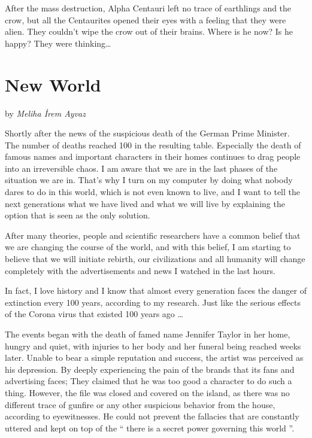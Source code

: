 \documentclass[]{book}
\begin{document}
After the mass destruction, Alpha Centauri left no trace of earthlings and the crow, but all the Centaurites opened their eyes with a feeling that they were alien. They couldn't wipe the crow out of their brains. Where is he now? Is he happy? They were thinking\ldots{}

\hypertarget{new-world}{%
\chapter{New World}\label{new-world}}

by \emph{Meliha İrem Ayvaz}

Shortly after the news of the suspicious death of the German Prime Minister. The number of deaths reached 100 in the resulting table. Especially the death of famous names and important characters in their homes continues to drag people into an irreversible chaos. I am aware that we are in the last phases of the situation we are in. That's why I turn on my computer by doing what nobody dares to do in this world, which is not even known to live, and I want to tell the next generations what we have lived and what we will live by explaining the option that is seen as the only solution.

After many theories, people and scientific researchers have a common belief that we are changing the course of the world, and with this belief, I am starting to believe that we will initiate rebirth, our civilizations and all humanity will change completely with the advertisements and news I watched in the last hours.

In fact, I love history and I know that almost every generation faces the danger of extinction every 100 years, according to my research. Just like the serious effects of the Corona virus that existed 100 years ago \ldots{}

The events began with the death of famed name Jennifer Taylor in her home, hungry and quiet, with injuries to her body and her funeral being reached weeks later. Unable to bear a simple reputation and success, the artist was perceived as his depression. By deeply experiencing the pain of the brands that its fans and advertising faces; They claimed that he was too good a character to do such a thing. However, the file was closed and covered on the island, as there was no different trace of gunfire or any other suspicious behavior from the house, according to eyewitnesses. He could not prevent the fallacies that are constantly uttered and kept on top of the `` there is a secret power governing this world ''.
\end{document}
